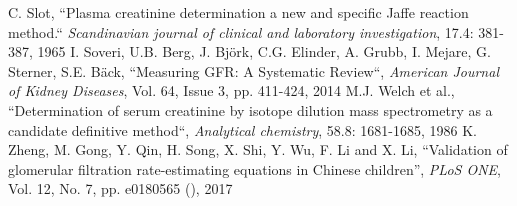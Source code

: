 \documentclass[10pt,final]{siamltex}
\begin{document}
\begin{thebibliography}{99}
   C. Slot, ``Plasma creatinine determination a new and specific Jaffe reaction method.`` \textit{Scandinavian journal of clinical and laboratory investigation}, 17.4: 381-387, 1965
  I. Soveri, U.B. Berg, J. Björk, C.G. Elinder, A. Grubb, I. Mejare, G. Sterner, S.E. Bäck, ``Measuring GFR: A Systematic Review``, \textit{American Journal of Kidney Diseases}, Vol. 64, Issue 3, pp. 411-424, 2014
   M.J. Welch et al., ``Determination of serum creatinine by isotope dilution mass spectrometry as a candidate definitive method``, \textit{Analytical chemistry}, 58.8: 1681-1685, 1986
   K. Zheng, M. Gong, Y. Qin, H. Song, X. Shi, Y. Wu, F. Li and X. Li, ``Validation of glomerular filtration rate-estimating equations in Chinese children'', \textit{PLoS ONE}, Vol. 12, No. 7, pp. e0180565 (), 2017
\end{thebibliography}
\end{document}

